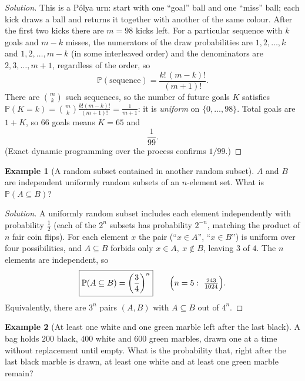 \documentclass[11pt]{article}
\theoremstyle{definition}
\newtheorem{example}{Example}[section]
\begin{document}
\begin{proof}[Solution]
This is a P\'olya urn: start with one ``goal'' ball and one ``miss'' ball; each kick draws a ball and returns it together with another of the same colour. After the first two kicks there are $m=98$ kicks left. For a particular sequence with $k$ goals and $m-k$ misses, the numerators of the draw probabilities are $1,2,\dots,k$ and $1,2,\dots,m-k$ (in some interleaved order) and the denominators are $2,3,\dots,m+1$, regardless of the order, so
\[
\mathbb P(\text{sequence})=\frac{k!\,(m-k)!}{(m+1)!}.
\]
There are $\binom mk$ such sequences, so the number of future goals $K$ satisfies $\mathbb P(K=k)=\binom mk\frac{k!(m-k)!}{(m+1)!}=\frac1{m+1}$: it is \emph{uniform} on $\{0,\dots,98\}$. Total goals are $1+K$, so $66$ goals means $K=65$ and
\[
\boxed{\frac1{99}}.
\]
(Exact dynamic programming over the process confirms $1/99$.)
\end{proof}

\begin{example}[A random subset contained in another random subset]
$A$ and $B$ are independent uniformly random subsets of an $n$-element set. What is $\mathbb P(A\subseteq B)$?
\end{example}

\begin{proof}[Solution]
A uniformly random subset includes each element independently with probability $\tfrac12$ (each of the $2^n$ subsets has probability $2^{-n}$, matching the product of $n$ fair coin flips). For each element $x$ the pair (``$x\in A$'', ``$x\in B$'') is uniform over four possibilities, and $A\subseteq B$ forbids only $x\in A,\ x\notin B$, leaving $3$ of $4$. The $n$ elements are independent, so
\[
\boxed{\mathbb P(A\subseteq B)=\left(\frac34\right)^n}\qquad\Bigl(n=5:\ \tfrac{243}{1024}\Bigr).
\]
Equivalently, there are $3^n$ pairs $(A,B)$ with $A\subseteq B$ out of $4^n$.
\end{proof}

\begin{example}[At least one white and one green marble left after the last black]
A bag holds $200$ black, $400$ white and $600$ green marbles, drawn one at a time without replacement until empty. What is the probability that, right after the last black marble is drawn, at least one white and at least one green marble remain?
\end{example}
\end{document}

